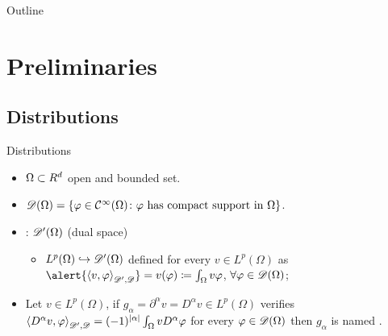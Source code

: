 
\begin{frame}[t,plain]
\titlepage
\end{frame}

\begin{frame}{Outline}
	\tableofcontents
\end{frame}

\section{Preliminaries}

\subsection{Distributions}

\begin{frame}{Distributions}

\begin{itemize}\itemsep1em
	\item $\Omega\subset\relax R^d$ open and bounded set.
	\item $\mathscr{D}(\Omega)=\{\varphi\in\mathcal{C}^\infty(\Omega)\colon\varphi\text{ has compact support in }\Omega\}$. 
	
	\item {}: $\mathscr{D}'(\Omega)$ (dual space)
	\begin{itemize}\itemsep1em
		\item $L^p(\Omega)\hookrightarrow\mathscr{D} '(\Omega)$ defined for every $v\in L^p(\Omega)$ as $\alert{\dualD{v}{\varphi}}=v(\varphi)\coloneqq\int_\Omega v \varphi$, $\forall \varphi\in\mathscr{D}(\Omega)$;
	\end{itemize}

	\item Let $v\in L^p(\Omega)$, if $g_\alpha=\partial^\alpha v=D^\alpha v\in L^p(\Omega)$ verifies ${\langle D^\alpha v, \varphi \rangle}_{\mathscr{D'},\mathscr{D}}=(-1)^{\left|\alpha\right|}\int_\Omega v D^\alpha \varphi$ for every $\varphi\in\mathscr{D}(\Omega)$ then $g_\alpha$ is named .

\end{itemize}
\end{frame}

